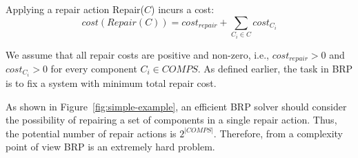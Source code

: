 

\begin{definition}
Applying a repair action Repair($C$) incurs a cost:
\[ cost(Repair(C)) = cost_{repair} + \sum_{C_i\in C} cost_{C_i} \]
\end{definition}
We assume that all repair costs are positive and non-zero, i.e., $cost_{repair}>0$ and $cost_{C_i}>0$ for every component $C_i \in COMPS$. As defined earlier, the task in BRP is to fix a system with minimum total repair cost.


As shown in Figure~\ref{fig:simple-example}, an efficient BRP solver should consider the possibility of repairing a set of components in a single repair action. Thus, the potential number of repair actions is %
$2^{|COMPS|}$. Therefore, from a complexity point of view BRP is an extremely hard problem.



